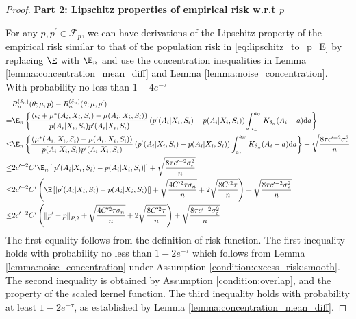 \begin{proof}
\noindent \textbf{Part 2: Lipschitz properties of empirical risk w.r.t $p$}

\noindent For any $p,p^\prime\in \mathcal{F}_p$, we can have derivations of the Lipschitz property of the empirical risk similar to that of the population risk in \eqref{eq:lipschitz_to_p_E} by replacing $\E$ with $\E_n$ and use the concentration inequalities in Lemma \ref{lemma:concentration_mean_diff} and Lemma \ref{lemma:noise_concentration}. With probability no less than $1-4e^{-\tau}$
\begin{align}
    &R_n^{({\delta_n})}(\theta;\mu, p) - R_n^{({\delta_n})}(\theta;\mu, p^\prime)\nonumber\\
    = &\E_n\left\{ \frac{\left(\epsilon_i +\mu^*(A_i,X_i,S_i) -  \mu(A_i,X_i,S_i)\right)}{ p(A_{i}|X_{i},S_{i})p^\prime(A_{i}|X_{i},S_{i})}\left(p^\prime(A_{i}|X_{i},S_{i}) -p(A_{i}|X_{i},S_{i})\right)\int_{a_L}^{a_U}K_{\delta_n}(A_i-a)\mathrm{d}a\right\}\nonumber\\
    \leq &\E_n\left\{ \frac{\left(\mu^*(A_i,X_i,S_i) -  \mu(A_i,X_i,S_i)\right)}{ p(A_{i}|X_{i},S_{i})p^\prime(A_{i}|X_{i},S_{i})}\left(p^\prime(A_{i}|X_{i},S_{i}) -p(A_{i}|X_{i},S_{i})\right)\int_{a_L}^{a_U}K_{\delta_n}(A_i-a)\mathrm{d}a\right\} + \sqrt{\frac{8\tau c^{\prime-2} \sigma_\epsilon^2}{n}}\nonumber\\
    \leq &2c^{\prime-2}C^{\prime}\E_n\left[\left|p^\prime(A_{i}|X_{i},S_{i}) -p(A_{i}|X_{i},S_{i})\right|\right] +  \sqrt{\frac{8\tau c^{\prime-2} \sigma_\epsilon^2}{n}}\nonumber\\
    \leq & 2c^{\prime-2}C^{\prime}\left(\E\left[\left|p^\prime(A_{i}|X_{i},S_{i}) -p(A_{i}|X_{i},S_{i})\right|\right]+\sqrt{\frac{4C^{\prime2}\tau\sigma_n}{n}} + 2\sqrt{\frac{8C^{\prime2}\tau}{n}}\right) + \sqrt{\frac{8\tau c^{\prime-2} \sigma_\epsilon^2}{n}}\nonumber\\
    \leq & 2c^{\prime-2}C^{\prime}\left(\left\|p^\prime -p\right\|_{P,2}+\sqrt{\frac{4C^{\prime2}\tau\sigma_n}{n}} + 2\sqrt{\frac{8C^{\prime2}\tau}{n}}\right)  + \sqrt{\frac{8\tau c^{\prime-2} \sigma_\epsilon^2}{n}}\label{eq:lipschitz_to_p_En}
\end{align}
The first equality follows from the definition of risk function. The first inequality holds with probability no less than $1-2e^{-\tau}$ which follows from Lemma \ref{lemma:noise_concentration} under Assumption \ref{condition:excess_risk:smooth}. The second inequality is obtained by Assumption \ref{condition:overlap}, and the property of the scaled kernel function. 
The third inequality holds with probability at least $1-2e^{-\tau}$, as established by Lemma \ref{lemma:concentration_mean_diff}.


\end{proof}
